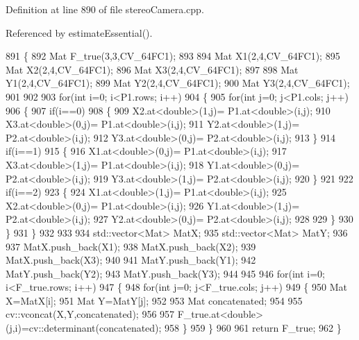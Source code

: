 Definition at line 890 of file stereo\+Camera.\+cpp.



Referenced by estimate\+Essential().


\begin{DoxyCode}
891 \{
892     Mat F\_true(3,3,CV\_64FC1);
893 
894     Mat X1(2,4,CV\_64FC1);
895     Mat X2(2,4,CV\_64FC1);
896     Mat X3(2,4,CV\_64FC1);
897 
898     Mat Y1(2,4,CV\_64FC1);
899     Mat Y2(2,4,CV\_64FC1);
900     Mat Y3(2,4,CV\_64FC1);
901 
902 
903     \textcolor{keywordflow}{for}(\textcolor{keywordtype}{int} i=0; i<P1.rows; i++)
904     \{
905         \textcolor{keywordflow}{for}(\textcolor{keywordtype}{int} j=0; j<P1.cols; j++)
906         \{
907             \textcolor{keywordflow}{if}(i==0)
908             \{
909                 X2.at<\textcolor{keywordtype}{double}>(1,j)= P1.at<\textcolor{keywordtype}{double}>(i,j);
910                 X3.at<\textcolor{keywordtype}{double}>(0,j)= P1.at<\textcolor{keywordtype}{double}>(i,j);
911                 Y2.at<\textcolor{keywordtype}{double}>(1,j)= P2.at<\textcolor{keywordtype}{double}>(i,j);
912                 Y3.at<\textcolor{keywordtype}{double}>(0,j)= P2.at<\textcolor{keywordtype}{double}>(i,j);
913             \}
914             \textcolor{keywordflow}{if}(i==1)
915             \{
916                 X1.at<\textcolor{keywordtype}{double}>(0,j)= P1.at<\textcolor{keywordtype}{double}>(i,j);
917                 X3.at<\textcolor{keywordtype}{double}>(1,j)= P1.at<\textcolor{keywordtype}{double}>(i,j);
918                 Y1.at<\textcolor{keywordtype}{double}>(0,j)= P2.at<\textcolor{keywordtype}{double}>(i,j);
919                 Y3.at<\textcolor{keywordtype}{double}>(1,j)= P2.at<\textcolor{keywordtype}{double}>(i,j);
920             \}
921 
922             \textcolor{keywordflow}{if}(i==2)
923             \{
924                 X1.at<\textcolor{keywordtype}{double}>(1,j)= P1.at<\textcolor{keywordtype}{double}>(i,j);
925                 X2.at<\textcolor{keywordtype}{double}>(0,j)= P1.at<\textcolor{keywordtype}{double}>(i,j);
926                 Y1.at<\textcolor{keywordtype}{double}>(1,j)= P2.at<\textcolor{keywordtype}{double}>(i,j);
927                 Y2.at<\textcolor{keywordtype}{double}>(0,j)= P2.at<\textcolor{keywordtype}{double}>(i,j);
928 
929             \}
930         \}
931     \}
932 
933 
934     std::vector<Mat> MatX;
935     std::vector<Mat> MatY;
936 
937     MatX.push\_back(X1);
938     MatX.push\_back(X2);
939     MatX.push\_back(X3);
940 
941     MatY.push\_back(Y1);
942     MatY.push\_back(Y2);
943     MatY.push\_back(Y3);
944 
945 
946     \textcolor{keywordflow}{for}(\textcolor{keywordtype}{int} i=0; i<F\_true.rows; i++)
947     \{
948         \textcolor{keywordflow}{for}(\textcolor{keywordtype}{int} j=0; j<F\_true.cols; j++)
949         \{
950             Mat X=MatX[i];
951             Mat Y=MatY[j];
952 
953             Mat concatenated;
954 
955             cv::vconcat(X,Y,concatenated);
956 
957             F\_true.at<\textcolor{keywordtype}{double}>(j,i)=cv::determinant(concatenated);
958         \}
959     \}
960 
961     \textcolor{keywordflow}{return} F\_true;
962 \}
\end{DoxyCode}
